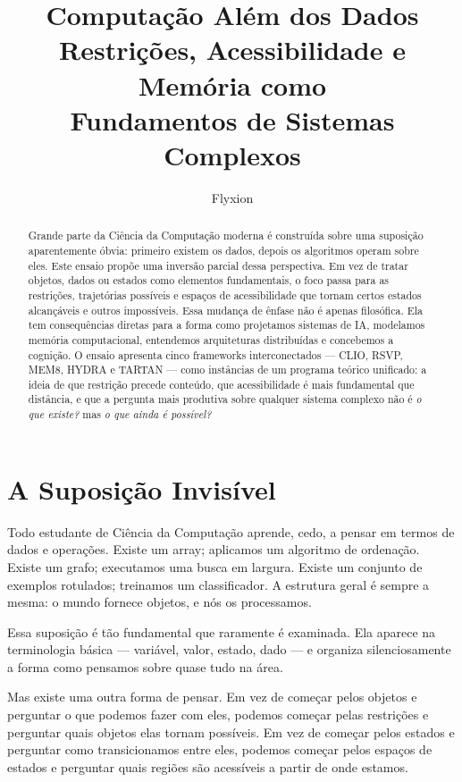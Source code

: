 \documentclass[11pt, a4paper]{article}
\title{%
  \textbf{Computação Além dos Dados}\\[0.4em]
  \large Restrições, Acessibilidade e Memória como\\
  Fundamentos de Sistemas Complexos
}
\author{Flyxion}
\date{}
\theoremstyle{named}
\begin{document}
\maketitle
\thispagestyle{empty}

\begin{abstract}
Grande parte da Ciência da Computação moderna é construída sobre uma
suposição aparentemente óbvia: primeiro existem os dados, depois os
algoritmos operam sobre eles. Este ensaio propõe uma inversão parcial
dessa perspectiva. Em vez de tratar objetos, dados ou estados como
elementos fundamentais, o foco passa para as restrições, trajetórias
possíveis e espaços de acessibilidade que tornam certos estados
alcançáveis e outros impossíveis. Essa mudança de ênfase não é apenas
filosófica. Ela tem consequências diretas para a forma como projetamos
sistemas de IA, modelamos memória computacional, entendemos arquiteturas
distribuídas e concebemos a cognição. O ensaio apresenta cinco
frameworks interconectados — CLIO, RSVP, MEM\textbar{}8, HYDRA e TARTAN
— como instâncias de um programa teórico unificado: a ideia de que
restrição precede conteúdo, que acessibilidade é mais fundamental que
distância, e que a pergunta mais produtiva sobre qualquer sistema
complexo não é \emph{o que existe?} mas \emph{o que ainda é possível?}
\end{abstract}

\newpage
\tableofcontents
\newpage

\section{A Suposição Invisível}

Todo estudante de Ciência da Computação aprende, cedo, a pensar em
termos de dados e operações. Existe um array; aplicamos um algoritmo de
ordenação. Existe um grafo; executamos uma busca em largura. Existe um
conjunto de exemplos rotulados; treinamos um classificador. A estrutura
geral é sempre a mesma: o mundo fornece objetos, e nós os processamos.

Essa suposição é tão fundamental que raramente é examinada. Ela aparece
na terminologia básica — variável, valor, estado, dado — e organiza
silenciosamente a forma como pensamos sobre quase tudo na área.

Mas existe uma outra forma de pensar. Em vez de começar pelos objetos e
perguntar o que podemos fazer com eles, podemos começar pelas restrições
e perguntar quais objetos elas tornam possíveis. Em vez de começar pelos
estados e perguntar como transicionamos entre eles, podemos começar
pelos espaços de estados e perguntar quais regiões são acessíveis a
partir de onde estamos.
\end{document}
